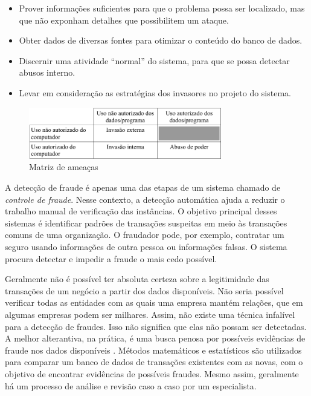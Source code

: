 \begin{itemize}
\item Prover informações suficientes para que o problema possa ser localizado, mas que não exponham detalhes que possibilitem um ataque.
\item Obter dados de diversas fontes para otimizar o conteúdo do banco de dados.
\item Discernir uma atividade ``normal'' do sistema, para que se possa detectar abusos interno.
\item Levar em consideração as estratégias dos invasores no projeto do sistema.
\end{itemize}

\begin{figure}[h!]
\centering
\includegraphics[width=0.75\textwidth]{img/anderson.png}
\caption{Matriz de ameaças}
\label{fig:and}
\end{figure}

A detecção de fraude é apenas uma das etapas de um sistema chamado de \emph{controle de fraude}. Nesse contexto, a detecção automática ajuda a reduzir o trabalho manual de verificação das instâncias. O objetivo principal desses sistemas é identificar padrões de transações suspeitas em meio às transações comuns de uma organização. O fraudador pode, por exemplo, contratar um seguro usando informações de outra pessoa ou informações falsas. O sistema procura detectar e impedir a fraude o mais cedo possível.

Geralmente não é possível ter absoluta certeza sobre a legitimidade das transações de um negócio a partir dos dados disponíveis. Não seria possível verificar todas as entidades com as quais uma empresa mantém relações, que em algumas empresas podem ser milhares. Assim, não existe uma técnica infalível para a detecção de fraudes. Isso não significa que elas não possam ser detectadas. A melhor alterantiva, na prática, é uma busca penosa por possíveis evidências de fraude nos dados disponíveis \cite{Phua2010}. Métodos matemáticos e estatísticos são utilizados para comparar um banco de dados de transações existentes com as novas, com o objetivo de encontrar evidências de possíveis fraudes. Mesmo assim, geralmente há um processo de análise e revisão caso a caso por um especialista.

